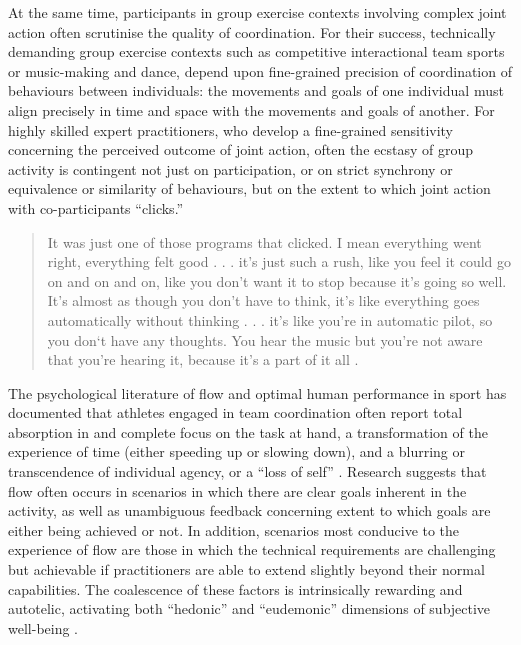 \begin{CJK}{UTF8}{gbsn}
At the same time, participants in group exercise contexts involving complex joint action often scrutinise the quality of coordination.  For their success, technically demanding group exercise contexts such as competitive interactional team sports or music-making and dance, depend upon fine-grained precision of coordination of behaviours between individuals:  the movements and goals of one individual must align precisely in time and space with the movements and goals of another.  For highly skilled expert practitioners, who develop a fine-grained sensitivity concerning the perceived outcome of joint action, often the ecstasy of group activity is contingent not just on participation, or on strict synchrony or equivalence or similarity of behaviours, but on the extent to which joint action with co-participants ``clicks.''


  \begin{quotation}
    It was just one of those programs that clicked. I mean everything went right, everything felt good . . . it's just such a rush, like you feel it could go on and on and on, like you don't want it to stop because it's going so well. It's almost as though you don't have to think, it's like everything goes automatically without thinking . . . it's like you're in automatic pilot, so you don‘t have any thoughts. You hear the music but you're not aware that you're hearing it, because it's a part of it all \citep[]{Jackson1992}.
  \end{quotation}

The psychological literature of flow and optimal human performance in sport has documented that athletes engaged in team coordination often report total absorption in and complete focus on the task at hand, a transformation of the experience of time (either speeding up or slowing down), and a blurring or transcendence of individual agency, or a ``loss of self''   \citep{Csikszentmihalyi1992,Jackson1995,Jackson1999,McNeill1995}.  Research suggests that flow often occurs in scenarios in which there are clear goals inherent in the activity, as well as unambiguous feedback concerning extent to which goals are either being achieved or not.  In addition, scenarios most conducive to the experience of flow are those in which the technical requirements are challenging but achievable if practitioners are able to extend slightly beyond their normal capabilities\citep{Fong2015}.
The coalescence of these factors is intrinsically rewarding and autotelic\citep{Csikszentmihalyi1975}, activating both ``hedonic'' and ``eudemonic'' dimensions of subjective well-being \citep{Huta2010,Fave2009}.


\end{CJK}

